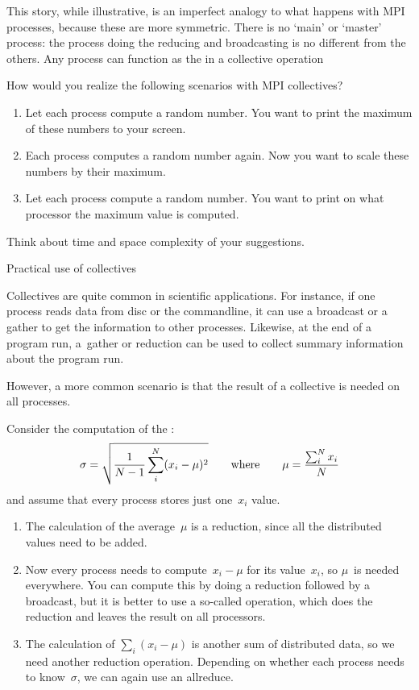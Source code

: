 This story, while illustrative, is an imperfect analogy to
what happens with MPI processes, because these are more symmetric.
There is no `main' or `master' process: the process doing the
reducing and broadcasting is no different from the others.
Any process can function as the  in a
collective operation

\begin{exercise}
  \label{ex:collective-cases}
  How would you realize the following scenarios with MPI collectives?
  \begin{enumerate}
  \item Let each process compute a random number. You want to print the
    maximum of these numbers to your screen.
  \item Each process computes a random number again. Now you want to
    scale these numbers by their maximum. 
  \item Let each process compute a random number. You want to print on what processor the
    maximum value is computed. 
  \end{enumerate}
  Think about time and space complexity of your suggestions.
\end{exercise}

 {Practical use of collectives}

Collectives are quite common in scientific applications. For instance,
if one process reads data from disc or the commandline, it can use a
broadcast or a gather to get the information to other
processes. Likewise, at the end of a program run, a~gather or
reduction can be used to collect summary information about the program
run.

However, a more common scenario is 
that the result of a collective is needed on all processes.

Consider the computation of the :
\[ \sigma = \sqrt{\frac1{N-1} \sum_i^N (x_i-\mu)^2 }
\qquad\hbox{where}\qquad \mu = \frac{\sum_i^Nx_i}N
\]
and assume that every process stores just one~$x_i$ value.
\begin{enumerate}
\item The calculation of the average~$\mu$ is a reduction, since all
  the distributed values need to be added.
\item Now every
  process needs to compute~$x_i-\mu$ for its value~$x_i$, so $\mu$~is
  needed everywhere. You can compute this by doing a reduction followed
  by a broadcast, but it is better to use a so-called
   operation, which does the reduction and leaves
  the result on all processors.
\item The calculation of $\sum_i(x_i-\mu)$ is another sum of
  distributed data, so we need another reduction operation. Depending
  on whether each process needs to know~$\sigma$, we can again use an
  allreduce.
\end{enumerate}

